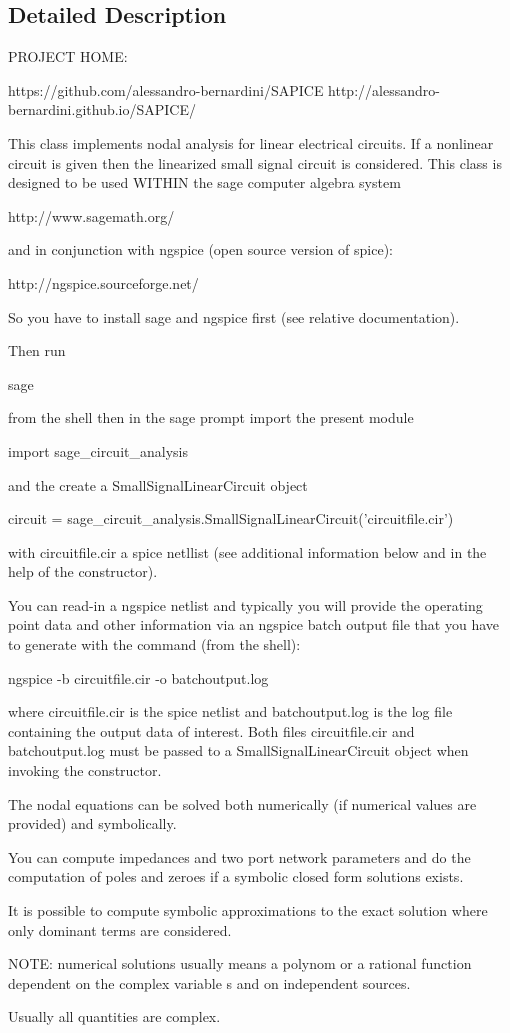 \subsection{Detailed Description}
\begin{DoxyVerb}PROJECT HOME:

    https://github.com/alessandro-bernardini/SAPICE
    http://alessandro-bernardini.github.io/SAPICE/

This class implements nodal analysis for linear electrical circuits.
If a nonlinear circuit is given then the linearized small signal circuit is
considered.
This class is designed to be used WITHIN the sage computer algebra system

    http://www.sagemath.org/

and in conjunction with ngspice (open source version of spice):

    http://ngspice.sourceforge.net/

So you have to install sage and ngspice first (see relative documentation).

Then run        

    sage

from the shell
then in the sage prompt import the present module

    import sage_circuit_analysis

and the create a SmallSignalLinearCircuit object

    circuit = sage_circuit_analysis.SmallSignalLinearCircuit('circuitfile.cir')

with circuitfile.cir a spice netllist (see additional information below
and in the help of the constructor).

You can read-in a ngspice netlist and typically you will provide the operating
point data and other information via an ngspice batch output file
that you have to generate with the command (from the shell):

    ngspice -b circuitfile.cir -o batchoutput.log

where circuitfile.cir is the spice netlist
and batchoutput.log is the log file containing the output data of interest.
Both files circuitfile.cir and batchoutput.log must be passed
to a SmallSignalLinearCircuit object when invoking the constructor.

The nodal equations can be solved both numerically (if numerical values
are provided) and symbolically.

You can compute impedances and two port network parameters and do
the computation of poles and zeroes if a symbolic closed form solutions
exists.

It is possible to compute symbolic approximations to the exact solution
where only dominant terms are considered.

NOTE: numerical solutions usually means a polynom or a rational function
dependent on the complex variable s and on independent sources.

Usually all quantities are complex.
\end{DoxyVerb}
 

